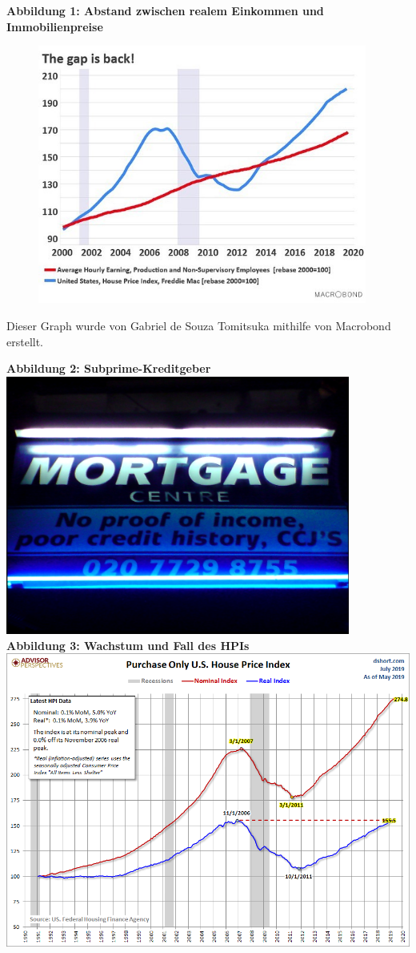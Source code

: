 \documentclass[a4paper,11pt]{report}
\begin{document}
\textbf{Abbildung 1: Abstand zwischen realem Einkommen
und Immobilienpreise}
\begin{figure}[h]
\includegraphics[height=8.5cm]{abb1}
\end{figure}

Dieser Graph wurde von Gabriel de Souza Tomitsuka mithilfe von Macrobond erstellt.
\newline

\textbf{Abbildung 2: Subprime-Kreditgeber}
\newline
\includegraphics[height=8.5cm]{abb2}
\newpage
\textbf{Abbildung 3: Wachstum und Fall des HPIs}
\newline
\includegraphics[width=\textwidth]{abb3}
\end{document}
